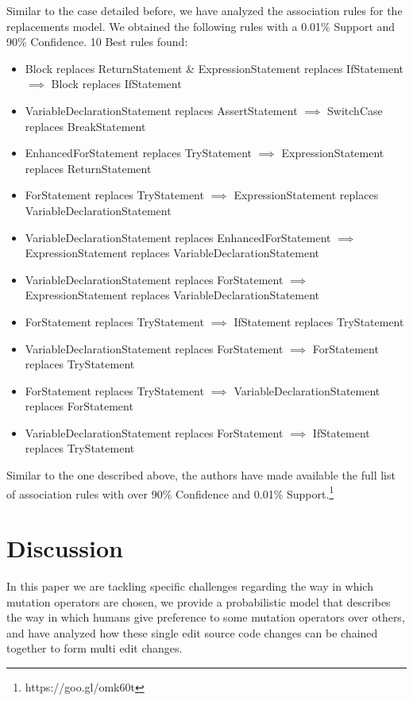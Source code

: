 \documentclass[conference]{IEEEtran}
\begin{document}
Similar to the case detailed before, we have analyzed the association rules for the replacements model. We obtained the following rules with a 0.01\% Support and 90\% Confidence.
10 Best rules found:
\begin{itemize}
\item Block replaces ReturnStatement \& ExpressionStatement replaces IfStatement $\implies$ Block replaces IfStatement
\item VariableDeclarationStatement replaces AssertStatement $\implies$ SwitchCase replaces BreakStatement
\item EnhancedForStatement replaces TryStatement $\implies$ ExpressionStatement replaces ReturnStatement
\item ForStatement replaces TryStatement $\implies$ ExpressionStatement replaces VariableDeclarationStatement
\item VariableDeclarationStatement replaces EnhancedForStatement $\implies$ ExpressionStatement replaces VariableDeclarationStatement
\item VariableDeclarationStatement replaces ForStatement $\implies$ ExpressionStatement replaces VariableDeclarationStatement
\item ForStatement replaces TryStatement $\implies$ IfStatement replaces TryStatement
\item VariableDeclarationStatement replaces ForStatement $\implies$ ForStatement replaces TryStatement
\item ForStatement replaces TryStatement $\implies$ VariableDeclarationStatement replaces ForStatement
\item VariableDeclarationStatement replaces ForStatement $\implies$ IfStatement replaces TryStatement
\end{itemize}

Similar to the one described above, the authors have made available the full list of association rules with over 90\% Confidence and 0.01\% Support.\footnote{https://goo.gl/omk60t}

\section{Discussion} \label{discussion}
In this paper we are tackling specific 
challenges regarding the way in which mutation operators are chosen, we provide 
a probabilistic model that describes the way in which humans give preference to 
some mutation operators over others, and have analyzed how these single edit 
source code changes can be chained together to form multi edit changes.
\end{document}
